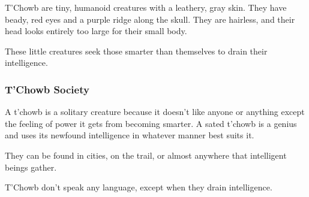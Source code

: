 T'Chowb are tiny, humanoid creatures with a leathery, gray skin. They have beady, red eyes and a purple ridge along the skull. They are hairless, and their head looks entirely too large for their small body.

These little creatures seek those smarter than themselves to drain their intelligence.

\subsubsection{T'Chowb Society}
A t'chowb is a solitary creature because it doesn't like anyone or anything except the feeling of power it gets from becoming smarter. A sated t'chowb is a genius and uses its newfound intelligence in whatever manner best suits it.

They can be found in cities, on the trail, or almost anywhere that intelligent beings gather.

T'Chowb don't speak any language, except when they drain intelligence.



